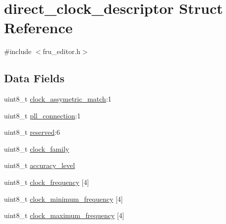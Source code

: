 \hypertarget{structdirect__clock__descriptor}{\section{direct\-\_\-clock\-\_\-descriptor Struct Reference}
\label{structdirect__clock__descriptor}
}


{\ttfamily \#include $<$fru\-\_\-editor.\-h$>$}

\subsection*{Data Fields}
\begin{DoxyCompactItemize}
\item 
uint8\-\_\-t \hyperlink{structdirect__clock__descriptor_a3be65c10fc6ac95897ad69f4e8811f68}{clock\-\_\-assymetric\-\_\-match}\-:1
\item 
uint8\-\_\-t \hyperlink{structdirect__clock__descriptor_af0863a4a7168074bd3c006d9e93f9af2}{pll\-\_\-connection}\-:1
\item 
uint8\-\_\-t \hyperlink{structdirect__clock__descriptor_a6d98c4131e3d9686da36c075e002c20d}{reserved}\-:6
\item 
uint8\-\_\-t \hyperlink{structdirect__clock__descriptor_ab03f027327bef1534c1c6a8063bae273}{clock\-\_\-family}
\item 
uint8\-\_\-t \hyperlink{structdirect__clock__descriptor_ad28b789865ad2c2eafa9984cb270e4a1}{accuracy\-\_\-level}
\item 
uint8\-\_\-t \hyperlink{structdirect__clock__descriptor_a9a159e80c9d6ac47e9d1d037ff8c6bf3}{clock\-\_\-frequency} \mbox{[}4\mbox{]}
\item 
uint8\-\_\-t \hyperlink{structdirect__clock__descriptor_adf3b49034069ce2cf7d808831b993e71}{clock\-\_\-minimum\-\_\-frequency} \mbox{[}4\mbox{]}
\item 
uint8\-\_\-t \hyperlink{structdirect__clock__descriptor_a43b971729733124d70a643df38d945b1}{clock\-\_\-maximum\-\_\-frequency} \mbox{[}4\mbox{]}
\end{DoxyCompactItemize}


